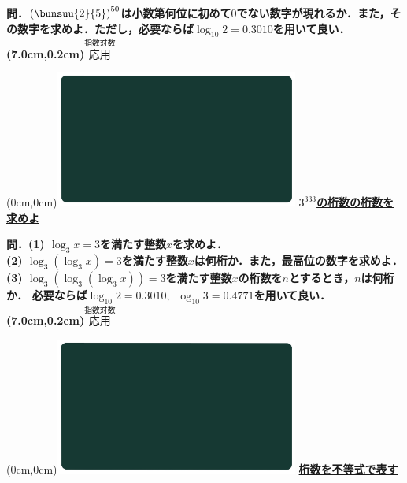 \documentclass[10pt,
fleqn,
dvipdfmx,
uplatex
]{jsarticle}
\begin{document}
\Large 
\bf\boldmath 問．$\left(\bunsuu{2}{5}\right)^{50}$は小数第何位に初めて$0$でない数字が現れるか．また，その数字を求めよ．ただし，必要ならば$\log _{10}2=0.{3010}$を用いて良い．
\at(7.0cm,0.2cm){\small\color{bradorange}$\overset{\text{指数対数}}{\text{応用}}$}


\newpage



\at(0cm,0cm){\includegraphics[width=8cm,bb=0 0 1920 1080]{./youtube/thumbnails/templates/smart_background/指数対数.jpeg}}
{\color{orange}\bf\boldmath\Large\underline{$3^{333}$の桁数の桁数を求めよ}}\vspace{0.3zw}

\normalsize 
\bf\boldmath 問．(1)  $\log _3x=3$を満たす整数$x$を求めよ．\\
(2)  $\log _3\left(\log _3x\right)=3$を満たす整数$x$は何桁か．また，最高位の数字を求めよ．\\
(3)  $\log _3\left(\log _3\left(\log _3x\right)\right)=3$を満たす整数$x$の桁数を$n$とするとき，$n$は何桁か．
必要ならば$\log _{10}2=0.{3010},\;\log _{10}3=0.{4771}$を用いて良い．\\

\at(7.0cm,0.2cm){\small\color{bradorange}$\overset{\text{指数対数}}{\text{応用}}$}


\newpage



\at(0cm,0cm){\includegraphics[width=8cm,bb=0 0 1920 1080]{./youtube/thumbnails/templates/smart_background/指数対数.jpeg}}
{\color{orange}\bf\boldmath\LARGE\underline{桁数を不等式で表す}}\vspace{0.3zw}
\end{document}
